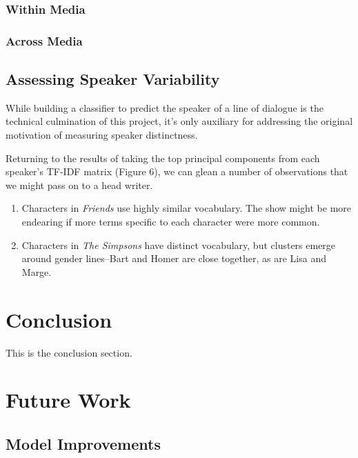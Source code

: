 \documentclass{article}
\begin{document}
\begin{titlepage}
\subsubsection{Within Media}
\subsubsection{Across Media}

\subsection{Assessing Speaker Variability}
While building a classifier to predict the speaker of a line of dialogue is the technical culmination of this project, it's only auxiliary for addressing the original motivation of measuring speaker distinctness.

Returning to the results of taking the top principal components from each speaker's TF-IDF matrix (Figure 6), we can glean a number of observations that we might pass on to a head writer.

\begin{enumerate}
\item Characters in \textit{Friends} use highly similar vocabulary. The show might be more endearing if more terms specific to each character were more common.
\item Characters in \textit{The Simpsons} have distinct vocabulary, but clusters emerge around gender lines–Bart and Homer are close together, as are Lisa and Marge. 
\end{enumerate}


\section{Conclusion}
This is the conclusion section.

\section{Future Work}
\subsection{Model Improvements}


\end{titlepage}
\end{document}

